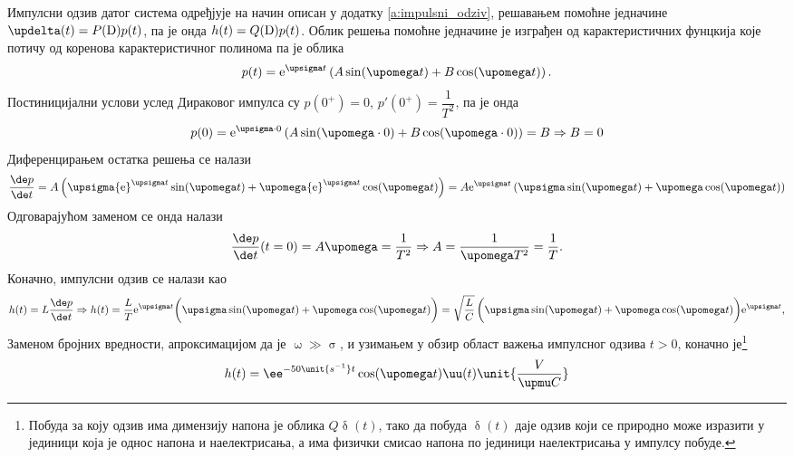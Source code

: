 Импулсни одзив датог система одређјује на начин описан у додатку 
\ref{a:impulsni_odziv}, решавањем помоћне 
једначине $\updelta(t) = P({\rm D}) p(t)$, па је онда 
$h(t) = Q({\rm D})p(t)$. Облик решења помоћне једначине је 
изграђен од карактеристичних фунцкија које потичу од 
коренова карактеристичног полинома па је облика
\begin{equation}
p(t) = {\rm e}^{\upsigma t} \left( A\sin(\upomega t) + 
B \cos(\upomega t) \right).
\end{equation}
Постиницијални услови услед Дираковог импулса су 
$p(0^+) = 0$, $p'(0^+) = \dfrac{1}{T^2}$, па је онда 
\begin{equation}
	p(0) = {\rm e^{\upsigma\cdot 0}}
	\left(A\sin(\upomega \cdot 0) + B\cos(\upomega\cdot 0)\right)
	= B \Rightarrow B = 0
\end{equation}
Диференцирањем остатка решења се налази 
\begin{equation}
	\dfrac{\de p}{\de t}
	= 
	A\left(
	\upsigma {\rm e}^{\upsigma t} \sin(\upomega t)
	+
	\upomega {\rm e}^{\upsigma t} \cos(\upomega t)
	\right)
	=
	A {\rm e}^{\upsigma t}
	\left(
	\upsigma \sin(\upomega t)
	+
	\upomega \cos(\upomega t)
	\right) 
\end{equation}
Одговарајућом заменом се онда налази 
\begin{equation}
	\dfrac{\de p}{\de t}(t = 0)
	= A\upomega = \dfrac{1}{T^2} 
	\Rightarrow A = \dfrac{1}{\upomega T^2} = 
	\dfrac{1}{T}.
\end{equation}
Коначно, импулсни одзив се налази као 
\begin{equation}
	h(t) = L \dfrac{\de p}{\de t}
	\Rightarrow	
	h(t) = 
	\dfrac{L}{T}
	{\rm e}^{\upsigma t}
	\bigg(
	\upsigma \sin(\upomega t)
	+
	\upomega \cos(\upomega t)
	\bigg) 	
	=
	\sqrt{\dfrac{L}{C}}\,
	\bigg(
	\upsigma \sin(\upomega t)
	+
	\upomega \cos(\upomega t)
	\bigg) 	
	{\rm e}^{\upsigma t}, 
\end{equation}
Заменом бројних вредности, апроксимацијом да је $\upomega\gg\upsigma$, 
и узимањем у обзир област важења импулсног одзива $t>0$, коначно је\footnote{
 Побуда за коју одзив има димензију напона је облика $Q\updelta(t)$, тако да побуда $\updelta(t)$ даје 
 одзив који се природно може изразити у јединици која је однос напона и наелектрисања, а има физички смисао
 напона по јединици наелектрисања у импулсу побуде. 
}
\begin{equation}
    h(t) = \ee^{-50\unit{s^{-1}}t } \cos(\upomega t) \uu(t) \unit{\dfrac{V}{\upmu C}}    
\end{equation}


